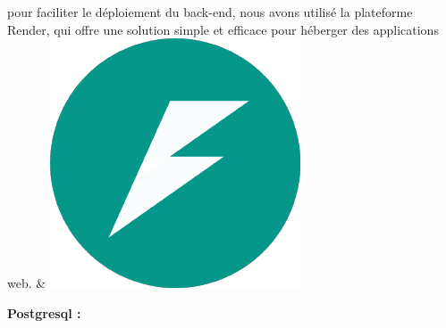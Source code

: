 \documentclass{article}
\begin{document}
\begin{tabular}
\hspace{0,2cm}pour faciliter le déploiement du back-end, nous avons utilisé la plateforme Render, qui offre une solution simple et efficace pour héberger des applications web.
&
\includegraphics[width=\linewidth]{fastapi.png} %
\end{tabular}

\vspace{0,8cm}

\noindent \large \textbf {Postgresql \cite{postgresql}:}

\vspace{0,3cm}
\end{document}
